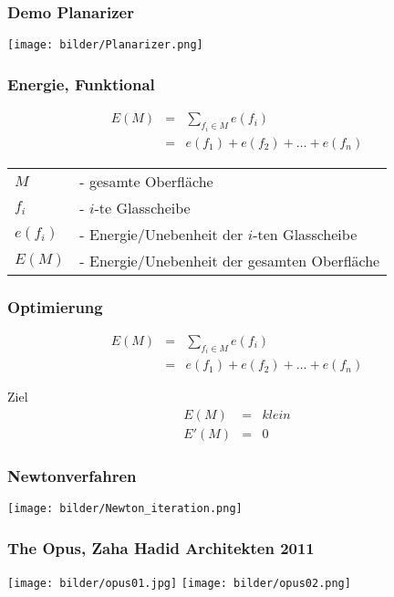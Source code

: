 \documentclass[12pt]{beamer}
\begin{document}
\begin{frame}
\frametitle{Demo Planarizer}
\begin{center}
\texttt{[image: bilder/Planarizer.png]}
\end{center}
\end{frame}

\begin{frame}
\frametitle{Energie, Funktional}
\begin{eqnarray*}
E(M)&=&\sum_{f_i\in M}e(f_i)\\
&=&e(f_1)+e(f_2)+\dots+e(f_n)
\end{eqnarray*}

\begin{tabular}{ll}
	$M$ & - gesamte Oberfl\"ache \\
	$f_i$ & - $i$-te Glasscheibe \\
	$e(f_i)$ & - Energie/Unebenheit der $i$-ten Glasscheibe \\
	$E(M)$ & - Energie/Unebenheit der gesamten Oberfl\"ache
\end{tabular}

\end{frame}

\begin{frame}
\frametitle{Optimierung}
\begin{eqnarray*}
E(M)&=&\sum_{f_i\in M}e(f_i)\\
&=&e(f_1)+e(f_2)+\dots+e(f_n)
\end{eqnarray*}

\begin{alertblock}{Ziel}
\begin{eqnarray*}
E(M)&=&klein \\
E'(M)&=&0
\end{eqnarray*}
\end{alertblock}
\end{frame}


\begin{frame}
\frametitle{Newtonverfahren}
\begin{center}
\texttt{[image: bilder/Newton\_iteration.png]}
\end{center}
\end{frame}


\begin{frame}
	\frametitle{The Opus, Zaha Hadid Architekten 2011}
	\begin{center}
	\texttt{[image: bilder/opus01.jpg]}
	\texttt{[image: bilder/opus02.png]}
	\end{center}
\end{frame}
\end{document}
